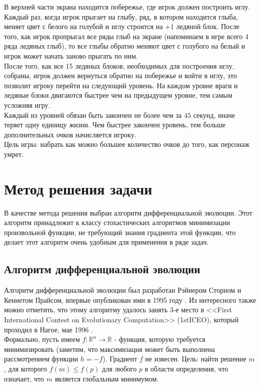 \documentclass[12pt]{article}
\begin{document}
    В верхней части экрана находится побережье, где игрок должен построить иглу. Каждый раз, когда игрок прыгает на глыбу, ряд, в котором находится глыба, меняет цвет с белого на голубой и иглу строится на $+1$ ледяной блок. После того, как игрок пропрыгал все ряды глыб на экране (напоминаем в игре всего 4 ряда ледяных глыб), то все глыбы обратно меняют цвет с голубого на белый и игрок может начать заново прыгать по ним. \\

    После того, как все 15 ледяных блоков, необходимых для построения иглу, собраны, игрок должен вернуться обратно на побережье и войти в иглу, это позволит игроку перейти на следующий уровень. На каждом уровне враги и ледяные блоки двигаются быстрее чем на предыдущем уровне, тем самым усложняя игру. \\

    Каждый из уровней обязан быть закончен не более чем за $45$ секунд, иначе теряет одну единицу жизни. Чем быстрее закончен уровень, тем больше дополнительных очков начисляется игроку. \\

    Цель игры: набрать как можно большее количество очков до того, как персонаж умрет.

\section{Метод решения задачи}
    В качестве метода решения выбран алгоритм дифференциальной эволюции. Этот алгоритм принадлежит к классу стохастических алгоритмов минимизации произвольной функции, не требующий знания градиента этой функции, что делает этот алгоритм очень удобным для применения в ряде задач.

    \subsection{Алгоритм дифференциальной эволюции}
        Алгоритм дифференциальной эволюции был разработан Рэйнером Сторном и Кеннетом Прайсом, впервые опубликован ими в 1995 году \cite{DE-1995}. Из интересного также можно отметить, что этому алгоритму удалось занять 3-е место в <<First International Contest on Evolutionary Computation>> (1stICEO), который проходил в Нагое, мае 1996 \cite{DE}. \\

        Формально, пусть имеем $f: \mathbb{R}^{n} \to \mathbb{R}$ - функция, которую требуется минимизировать (заметим, что максимизация может быть выполнена рассмотрением функции $h = -f$). Градиент $f$ не извесен. Цель: найти решение $m$, для которого $f(m) \leq f(p)$ для любого $p$ в области определения, что означает, что $m$ является глобальным минимумом. \\
\end{document}
